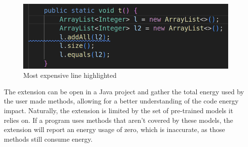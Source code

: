 \begin{figure}[htbp]
  \centering
  \includegraphics[width = .6 \textwidth]{figures/most_expensive_line.png}
  \caption{Most expensive line highlighted}
  \label{fig:most_expensive_line}
\end{figure}

The extension can be open in a Java project and gather the total energy used by the user made methods, allowing for a better understanding of the code energy impact. Naturally, the extension is limited by the set of pre-trained models it relies on. If a program uses methods that aren't covered by these models, the extension will report an energy usage of zero, which is inaccurate, as those methods still consume energy.


